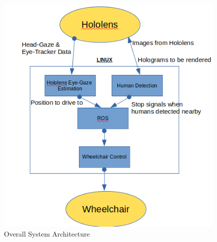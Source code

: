 \documentclass[12pt,a4paper]{report}
\begin{document}
\begin{figure}[h]
	\begin{center}
		\includegraphics[scale=0.9]{Images/Implementation/System_Design.png}
		\caption{Overall System Architecture}
		\label{app:fig:System_Architecture}
	\end{center}
\end{figure}
\end{document}
